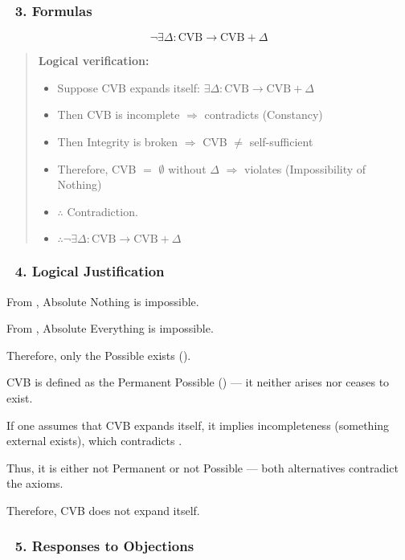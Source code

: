 \documentclass[12pt]{article}
\begin{document}
\subsubsection*{🔹 3. Formulas}

\[
\neg \exists \Delta : \mathrm{CVB} \rightarrow \mathrm{CVB} + \Delta
\]

\begin{quote}
\textbf{Logical verification:}
\begin{itemize}
\item Suppose CVB expands itself: $\exists \Delta : \mathrm{CVB} \rightarrow \mathrm{CVB} + \Delta$
\item Then CVB is incomplete $\Rightarrow$ contradicts \text{[4.4]} (Constancy)
\item Then Integrity is broken $\Rightarrow$ CVB $\neq$ self-sufficient
\item Therefore, CVB $=$ $\emptyset$ without $\Delta$ $\Rightarrow$ violates \text{[1]} (Impossibility of Nothing)
\item $\therefore$ Contradiction.
\item $\therefore \neg \exists \Delta : \mathrm{CVB} \rightarrow \mathrm{CVB} + \Delta$
\end{itemize}
\end{quote}

\subsubsection*{🔹 4. Logical Justification}

From \text{[1]}, Absolute Nothing is impossible.

From \text{[2]}, Absolute Everything is impossible.

Therefore, only the Possible exists (\text{[3]}).

CVB is defined as the Permanent Possible (\text{[4.4]}) — it neither arises nor ceases to exist.

If one assumes that CVB expands itself, it implies incompleteness (something external exists), which contradicts \text{[4.4]}.

Thus, it is either not Permanent or not Possible — both alternatives contradict the axioms.

Therefore, CVB does not expand itself.

\subsubsection*{🔹 5. Responses to Objections}
\end{document}
